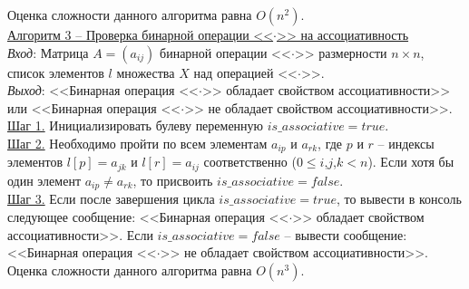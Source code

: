 \documentclass[bachelor, och, labwork]{shiza}
\begin{document}
            Оценка сложности данного алгоритма равна $O(n^2)$.\\

        \underline{Алгоритм 3 -- Проверка бинарной операции <<$\cdot$>> на ассоциативность}\\
            \textit{Вход}: Матрица $A = (a_{ij})$ бинарной операции <<$\cdot$>> размерности $n \times n$, список элементов $l$ множества $X$ над
            операцией <<$\cdot$>>.\\
            \textit{Выход}: <<Бинарная операция <<$\cdot$>> обладает свойством ассоциативности>> или 
            <<Бинарная операция <<$\cdot$>> не обладает свойством ассоциативности>>.\\
            \underline{Шаг 1.} Инициализировать булеву переменную $is\_associative = true$.\\
            \underline{Шаг 2.} Необходимо пройти по всем элементам $a_{ip}$ и $a_{rk}$, где $p$ и $r$ -- индексы элементов $l[p] = a_{jk}$
             и $l[r] = a_{ij}$ соответственно ($0 \leq i$,$j$,$k < n$). Если хотя бы один элемент $a_{ip} \neq a_{rk}$, 
            то присвоить $is\_associative = false$.\\
            \underline{Шаг 3.} Если после завершения цикла $is\_associative = true$, то вывести в консоль следующее сообщение:
            <<Бинарная операция <<$\cdot$>> обладает свойством ассоциативности>>. Если $is\_associative = false$ -- вывести сообщение:
            <<Бинарная операция <<$\cdot$>> не обладает свойством ассоциативности>>.\\
            
            Оценка сложности данного алгоритма равна $O(n^3)$.\\
        
\end{document}
